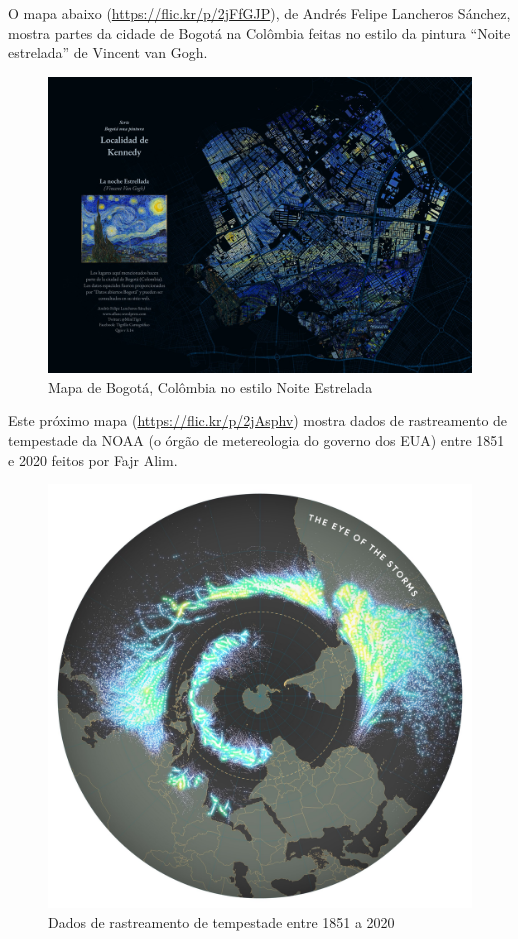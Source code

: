 \documentclass[
  portuguese,
]{krantz}
\begin{document}
O mapa abaixo (\url{https://flic.kr/p/2jFfGJP}), de Andrés Felipe Lancheros Sánchez, mostra partes da cidade de Bogotá na Colômbia feitas no estilo da pintura ``Noite estrelada'' de Vincent van Gogh.

\begin{figure}
\centering
\includegraphics{media/modulo1/sample-1.jpg}
\caption{Mapa de Bogotá, Colômbia no estilo Noite Estrelada}
\end{figure}

Este próximo mapa (\url{https://flic.kr/p/2jAsphv}) mostra dados de rastreamento de tempestade da NOAA (o órgão de metereologia do governo dos EUA) entre 1851 e 2020 feitos por Fajr Alim.

\begin{figure}
\centering
\includegraphics{media/modulo1/sample-2.jpg}
\caption{Dados de rastreamento de tempestade entre 1851 a 2020}
\end{figure}
\end{document}
